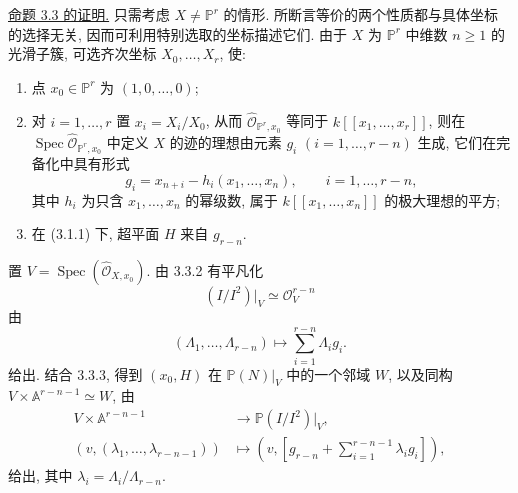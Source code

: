 \noindent\underline{命题 3.3 的证明.}
只需考虑 $X\ne\mathbb P^r$ 的情形. 所断言等价的两个性质都与具体坐标的选择无关, 因而可利用特别选取的坐标描述它们. 由于 $X$ 为 $\mathbb P^r$ 中维数 $n\geq1$ 的光滑子簇, 可选齐次坐标 $X_0,\ldots,X_r$, 使:
\begin{enumerate}
\item[3.3.1.] 点 $x_0\in\mathbb P^r$ 为 $(1,0,\ldots,0)$;
\item[3.3.2.] 对 $i=1,\ldots,r$ 置 $x_i=X_i/X_0$, 从而 $\widehat{\mathcal O}_{\mathbb P^r,x_0}$ 等同于 $k[[x_1,\ldots,x_r]]$, 则在 $\operatorname{Spec}\widehat{\mathcal O}_{\mathbb P^r,x_0}$ 中定义 $X$ 的迹的理想由元素 $g_i$ $(i=1,\ldots,r-n)$ 生成, 它们在完备化中具有形式
\[
g_i=x_{n+i}-h_i(x_1,\ldots,x_n),
\qquad i=1,\ldots,r-n,
\]
其中 $h_i$ 为只含 $x_1,\ldots,x_n$ 的幂级数, 属于 $k[[x_1,\ldots,x_n]]$ 的极大理想的平方;
\item[3.3.3.] 在 (3.1.1) 下, 超平面 $H$ 来自 $g_{r-n}$.
\end{enumerate}

置 $V=\operatorname{Spec}(\widehat{\mathcal O}_{X,x_0})$. 由 3.3.2 有平凡化
\[
(I/I^2)|_V\simeq\mathcal O_V^{r-n}
\]
由
\begin{equation}\tag{3.3.4}
(\Lambda_1,\ldots,\Lambda_{r-n})\longmapsto
\sum_{i=1}^{r-n}\Lambda_i g_i.
\end{equation}
给出. 结合 3.3.3, 得到 $(x_0,H)$ 在 $\mathbb P(N)|_V$ 中的一个邻域 $W$, 以及同构 $V\times\mathbb A^{r-n-1}\simeq W$, 由
\begin{equation}\tag{3.3.5}
\begin{aligned}
V\times\mathbb A^{r-n-1}&\longrightarrow\mathbb P(I/I^2)|_V,\\
(v,(\lambda_1,\ldots,\lambda_{r-n-1}))&\longmapsto
\left(v,\left[g_{r-n}+\sum_{i=1}^{r-n-1}\lambda_i g_i\right]\right),
\end{aligned}
\end{equation}
给出, 其中 $\lambda_i=\Lambda_i/\Lambda_{r-n}$.

